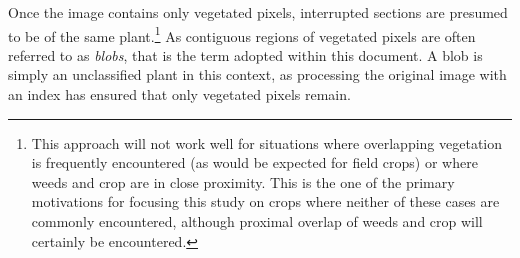 \documentclass[12pt]{article}
\begin{document}
%
%
%
%
%
%
%
%
%
Once the image contains only vegetated pixels, interrupted sections are presumed to be of the same plant.\footnote{This approach will not work well for situations where overlapping vegetation is frequently encountered (as would be expected for field crops) or where weeds and crop are in close proximity. This is the one of the primary motivations for focusing this study on crops where neither of these cases are commonly encountered, although proximal overlap of weeds and crop will certainly be encountered.} As contiguous regions of vegetated pixels are often referred to as \textit{blobs}, that is the term adopted within this document. A blob is simply an unclassified plant in this context, as processing the original image with an index has ensured that only vegetated pixels remain.
\end{document}
